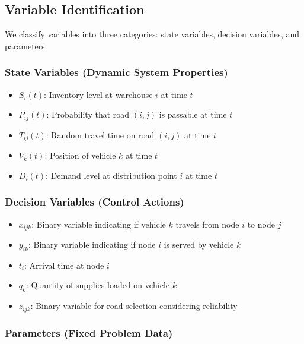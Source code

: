 \subsection{Variable Identification}

We classify variables into three categories: state variables, decision variables, and parameters.

\subsubsection{State Variables (Dynamic System Properties)}

\begin{itemize}
\item $S_{i}(t)$: Inventory level at warehouse $i$ at time $t$
\item $P_{ij}(t)$: Probability that road $(i,j)$ is passable at time $t$
\item $T_{ij}(t)$: Random travel time on road $(i,j)$ at time $t$
\item $V_k(t)$: Position of vehicle $k$ at time $t$
\item $D_i(t)$: Demand level at distribution point $i$ at time $t$
\end{itemize}

\subsubsection{Decision Variables (Control Actions)}

\begin{itemize}
\item $x_{ijk}$: Binary variable indicating if vehicle $k$ travels from node $i$ to node $j$
\item $y_{ik}$: Binary variable indicating if node $i$ is served by vehicle $k$
\item $t_i$: Arrival time at node $i$
\item $q_k$: Quantity of supplies loaded on vehicle $k$
\item $z_{ijk}$: Binary variable for road selection considering reliability
\end{itemize}

\subsubsection{Parameters (Fixed Problem Data)}

